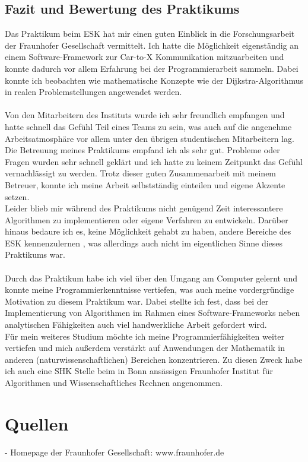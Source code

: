 \documentclass[a4paper]{scrartcl}
\begin{document}
\subsection{Fazit und Bewertung des Praktikums}
\label{sec:fazit-und-bewertung}

Das Praktikum beim ESK hat mir einen guten Einblick in die Forschungsarbeit der Fraunhofer Gesellschaft vermittelt. Ich hatte die Möglichkeit eigenständig an einem Software-Framework zur Car-to-X Kommunikation mitzuarbeiten und konnte dadurch vor allem Erfahrung bei der Programmierarbeit sammeln. Dabei konnte ich beobachten wie mathematische Konzepte wie der Dijkstra-Algorithmus in realen Problemstellungen angewendet werden. 
\\\\
Von den Mitarbeitern des Instituts wurde ich sehr freundlich empfangen und hatte schnell das Gefühl Teil eines Teams zu sein, was auch auf die angenehme Arbeitsatmosphäre vor allem unter den übrigen studentischen Mitarbeitern lag. \\
Die Betreuung meines Praktikums empfand ich als sehr gut. Probleme oder Fragen wurden sehr schnell geklärt und ich hatte zu keinem Zeitpunkt das Gefühl vernachlässigt zu werden. Trotz dieser guten Zusammenarbeit mit meinem Betreuer, konnte ich meine Arbeit selbstständig einteilen und eigene Akzente setzen. \\
Leider blieb mir während des Praktikums nicht genügend Zeit interessantere Algorithmen zu implementieren oder eigene Verfahren zu entwickeln. Darüber hinaus bedaure ich es, keine Möglichkeit gehabt zu haben, andere Bereiche des ESK kennenzulernen , was allerdings auch nicht im eigentlichen Sinne dieses Praktikums war. 
\\\\
Durch das Praktikum habe ich viel über den Umgang am Computer gelernt und konnte meine Programmierkenntnisse vertiefen, was auch meine vordergründige Motivation zu diesem Praktikum war. Dabei stellte ich fest, dass bei der Implementierung von Algorithmen im Rahmen eines Software-Frameworks neben analytischen Fähigkeiten auch viel handwerkliche Arbeit gefordert wird. \\
Für mein weiteres Studium möchte ich meine Programmierfähigkeiten weiter vertiefen und mich außerdem verstärkt auf Anwendungen der Mathematik in anderen (naturwissenschaftlichen) Bereichen konzentrieren. Zu diesen Zweck habe ich auch eine SHK Stelle beim in Bonn ansässigen Fraunhofer Institut für Algorithmen und Wissenschaftliches Rechnen angenommen. 


\section{Quellen} 
\label{sec:quellen}

- Homepage der Fraunhofer Gesellschaft: www.fraunhofer.de
\end{document}
